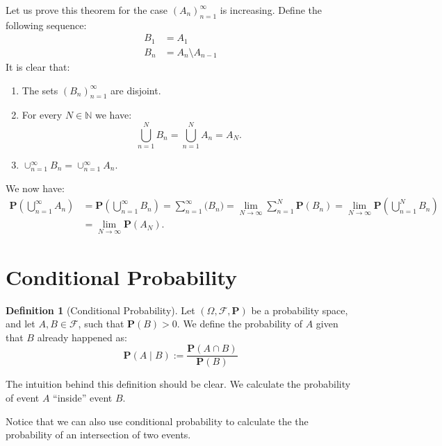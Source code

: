 \documentclass[11pt,a4paper]{article}
\theoremstyle{definition}
\newtheorem{definition}{Definition}[section]
\theoremstyle{plain}
\newcommand{\N}{\mathbb{N}}
\begin{document}
  Let us prove this theorem for the case $(A_n)_{n=1}^{\infty}$ is increasing.
  Define the following sequence:
  \begin{align*}
    B_1 &= A_1 \\
    B_n &= A_n \setminus A_{n-1}
  \end{align*}
  It is clear that:
  \begin{enumerate}
    \item The sets $(B_n)_{n=1}^{\infty}$ are disjoint.
    \item For every $N \in \N$ we have: 
      \[ \bigcup_{n=1}^{N} B_n = \bigcup_{n=1}^{N} A_n = A_N. \]
    \item $\cup_{n=1}^{\infty} B_n = \cup_{n=1}^{\infty} A_n$.
  \end{enumerate}
  We now have:
  \begin{align*}
    \mathbf P \left(\bigcup_{n=1}^{\infty} A_n\right) &=
    \mathbf P \left(\bigcup_{n=1}^{\infty} B_n\right) =
    \sum_{n=1}^{\infty} \mathbf(B_n) =
    \lim_{N \to \infty} \sum_{n=1}^{N} \mathbf P(B_n) =
    \lim_{N \to \infty} \mathbf P\left(\bigcup_{n=1}^{N} B_n\right) \\ &=
    \lim_{N \to \infty} \mathbf P(A_N).
  \end{align*}

  \newpage

  \section{Conditional Probability}
  \begin{definition}[Conditional Probability]
    Let $(\Omega, \mathcal F, \mathbf P)$ be a probability space, and let
    $A,B \in \mathcal F$, such that $\mathbf P(B) > 0$. We define the
    probability of $A$ given that $B$ already happened as:
    \[
      \mathbf P(A \mid B) := \frac{\mathbf P(A \cap B)}{\mathbf P(B)}
    \]
  \end{definition}

  The intuition behind this definition should be clear. We calculate the 
  probability of event $A$ ``inside'' event $B$.

  Notice that we can also use conditional probability to calculate the
  the probability of an intersection of two events.
\end{document}
